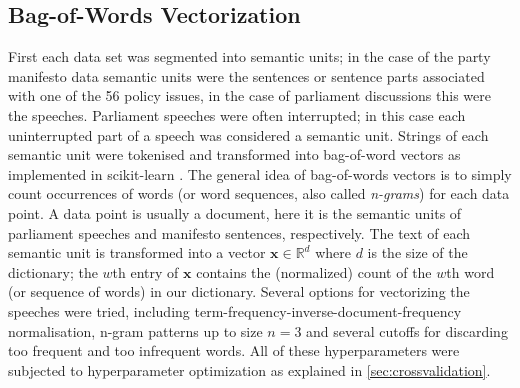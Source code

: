 \documentclass{article}
\renewcommand{\vec}[1]{\mathbf{#1}}
\begin{document}
\subsection{Bag-of-Words Vectorization}\label{sec:bow-vectorization}
First each data set was segmented into semantic units; in the case of the party manifesto data semantic units were the sentences or sentence parts associated with one of the 56 policy issues, in the case of parliament discussions this were the speeches. Parliament speeches were often interrupted; in this case each uninterrupted part of a speech was considered a semantic unit. Strings of each semantic unit were tokenised and transformed into bag-of-word vectors as implemented in scikit-learn \cite{scikit-learn}. The general idea of bag-of-words vectors is to simply count occurrences of words (or word sequences, also called {\em n-grams}) for each data point. A data point is usually a document, here it is the semantic units of parliament speeches and manifesto sentences, respectively. The text of each semantic unit is transformed into a vector $\vec{x}\in\mathds{R}^d$ where $d$ is the size of the dictionary; the $w$th entry of $\vec{x}$ contains the (normalized) count of the $w$th word (or sequence of words) in our dictionary. Several options for vectorizing the speeches were tried, including term-frequency-inverse-document-frequency normalisation, n-gram patterns up to size $n=3$ and several cutoffs for discarding too frequent and too infrequent words. All of these hyperparameters were subjected to hyperparameter optimization as explained in \autoref{sec:crossvalidation}.
\end{document}
